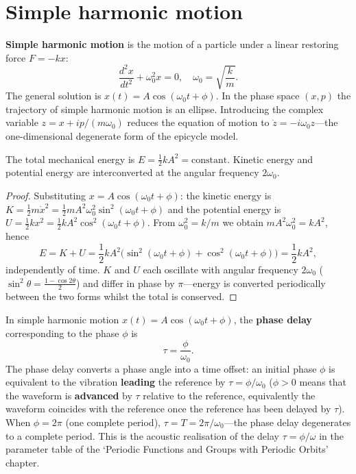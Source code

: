 \section{Simple harmonic motion}

\begin{definition}\label{def:simple_harmonic_motion}
\textbf{Simple harmonic motion} is the motion of a particle under a linear restoring force $F = -kx$:
\[
\frac{d^2 x}{dt^2} + \omega_0^2 x = 0, \quad \omega_0 = \sqrt{\frac{k}{m}}.
\]
The general solution is $x(t) = A\cos(\omega_0 t + \phi)$. In the phase space $(x, p)$ the trajectory of simple harmonic motion is an ellipse. Introducing the complex variable $z = x + i p/(m\omega_0)$ reduces the equation of motion to $\dot{z} = -i\omega_0 z$---the one-dimensional degenerate form of the epicycle model.
\end{definition}

\begin{proposition}\label{prop:harmonic_energy}
The total mechanical energy is $E = \frac{1}{2}kA^2 = \text{constant}$. Kinetic energy and potential energy are interconverted at the angular frequency $2\omega_0$.
\end{proposition}

\begin{proof}
Substituting $x = A\cos(\omega_0 t + \phi)$: the kinetic energy is $K = \frac{1}{2}m\dot x^2 = \frac{1}{2}mA^2\omega_0^2\sin^2(\omega_0 t + \phi)$ and the potential energy is $U = \frac{1}{2}kx^2 = \frac{1}{2}kA^2\cos^2(\omega_0 t + \phi)$. From $\omega_0^2 = k/m$ we obtain $mA^2\omega_0^2 = kA^2$, hence
\[
E = K + U = \frac{1}{2}kA^2\big(\sin^2(\omega_0 t + \phi) + \cos^2(\omega_0 t + \phi)\big) = \frac{1}{2}kA^2,
\]
independently of time. $K$ and $U$ each oscillate with angular frequency $2\omega_0$ ($\sin^2\theta = \frac{1-\cos 2\theta}{2}$) and differ in phase by $\pi$---energy is converted periodically between the two forms whilst the total is conserved.
\end{proof}

\begin{definition}\label{def:harmonic_phase_delay}
In simple harmonic motion $x(t) = A\cos(\omega_0 t + \phi)$, the \textbf{phase delay} corresponding to the phase $\phi$ is
\[
\tau = \frac{\phi}{\omega_0}.
\]
The phase delay converts a phase angle into a time offset: an initial phase $\phi$ is equivalent to the vibration \textbf{leading} the reference by $\tau = \phi/\omega_0$ ($\phi>0$ means that the waveform is \textbf{advanced} by $\tau$ relative to the reference, equivalently the waveform coincides with the reference once the reference has been delayed by $\tau$). When $\phi = 2\pi$ (one complete period), $\tau = T = 2\pi/\omega_0$---the phase delay degenerates to a complete period. This is the acoustic realisation of the delay $\tau = \phi/\omega$ in the parameter table of the `Periodic Functions and Groups with Periodic Orbits' chapter.
\end{definition}

